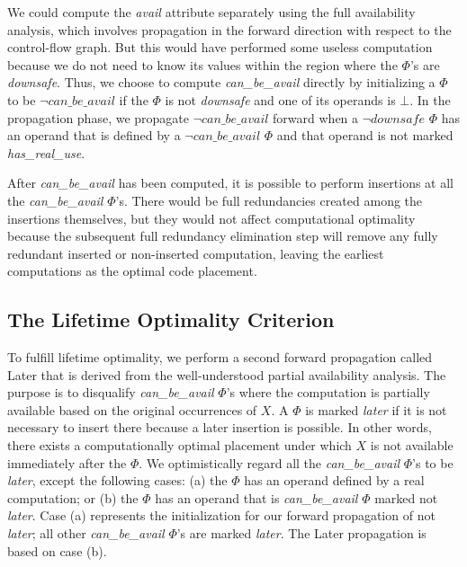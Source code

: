 We could compute the \emph{avail} attribute separately using the full
availability analysis, which involves propagation in the forward direction
with respect to the control-flow graph.  But this would have performed some
useless computation because we do not need to know its values within the region 
where the $\Phi$'s are \emph{downsafe}.  Thus, we choose to compute
\emph{can\_be\_avail} directly by initializing a $\Phi$ to be 
$\neg can\_be\_avail$ if
the $\Phi$ is not \emph{downsafe} and one of its operands is $\bot$.
In the propagation phase, we propagate $\neg can\_be\_avail$ forward when
a $\neg downsafe$  $\Phi$ has an operand that is defined by a 
$\neg can\_be\_avail$ $\Phi$ and that operand is not marked \emph{has\_real\_use}.

After \emph{can\_be\_avail} has been computed, it is possible to perform 
insertions at
all the \emph{can\_be\_avail} $\Phi$'s.  There would be full redundancies
created among the insertions themselves, but they would not affect 
computational optimality because the subsequent full redundancy elimination 
step will remove any fully redundant inserted or non-inserted computation, 
leaving the earliest computations as the optimal code placement.

\subsection{The Lifetime Optimality Criterion}

To fulfill lifetime optimality, we perform a second forward propagation called
Later that is derived from the well-understood partial availability 
analysis.  The purpose is to disqualify \emph{can\_be\_avail} $\Phi$'s where
the computation is
partially available based on the original occurrences of $X$.
A $\Phi$ is marked \emph{later} if it is not necessary to insert there because
a later insertion is possible.  In other words, there exists a computationally
optimal placement under which $X$ is not available immediately after the $\Phi$.
We optimistically regard all the
\emph{can\_be\_avail} $\Phi$'s to be \emph{later}, except the following cases:
(a) the $\Phi$ has an operand defined by a real computation; or (b) the $\Phi$
has an operand that is \emph{can\_be\_avail} $\Phi$ marked not \emph{later}.  Case (a) represents
the initialization for our forward propagation of not \emph{later}; all other
\emph{can\_be\_avail} $\Phi$'s are marked \emph{later}.  The Later
propagation is based on case (b).

